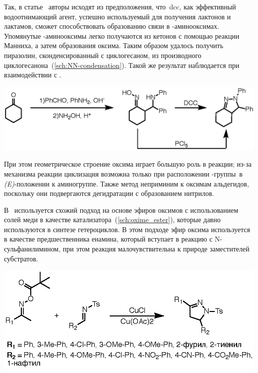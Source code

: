 Так, в статье~\cite{Hassner1962a} авторы исходят из предположения, что~\ac{dcc}, как эффективный водоотнимающий агент, успешно используемый для получения лактонов и лактамов, сможет способствовать образованию связи  в \chembeta-аминооксимах.
Упомянутые \chembeta-аминооксимы легко получаются из кетонов с помощью реакции Манниха, а затем образования оксима.
Таким образом удалось получить пиразолин, сконденсированный с циклогесаном, из производного циклогесанона~(\ref{sch:NN-condensation}).
Такой же результат наблюдается при взаимодействии с .

\begin{scheme}[h!]
    \centering
    \includegraphics{sections/literature/img/NN-condensation.eps}
    \caption{}
    \label{sch:NN-condensation}
\end{scheme}

При этом геометрическое строение оксима играет большую роль в реакции; из-за механизма реакции циклизация возможна только при расположении \mbox{-группы }в \mbox{\emph{(E)}-положении} к аминогруппе.
Также метод неприминим к оксимам альдегидов, поскольку они подвергаются дегидратации с образованием нитрилов.

В~\cite{Wu2014d} используется схожий подход на основе эфиров оксимов с использованием солей меди в качестве катализатора~(\ref{sch:oxime_ester}), которые давно используются в синтезе гетероциклов.
В этом подходе эфир оксима используется в качестве предшественника енамина, который вступает в реакцию с N-сульфанилимином, при этом реакция малочувствительна к природе заместителей субстратов.

\begin{scheme}[h!]
    \centering
    \includegraphics{sections/literature/img/oxime_ester.eps}
    \caption{}
    \label{sch:oxime_ester}
\end{scheme}

